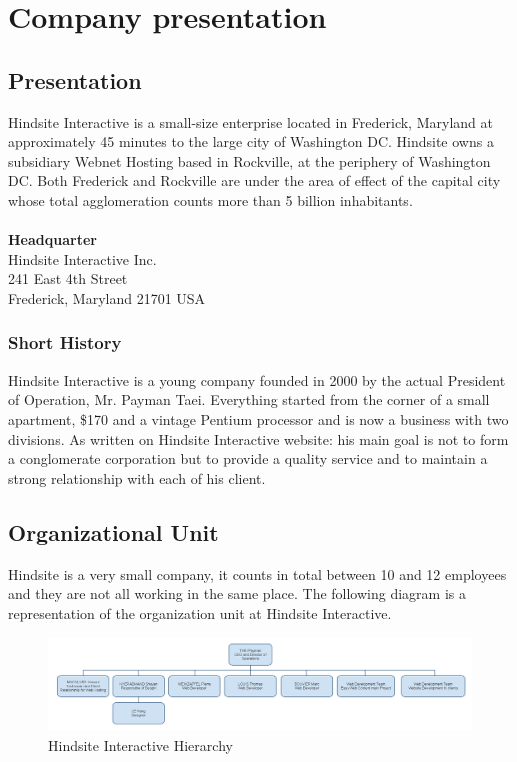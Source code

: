 \chapter{Company presentation}

\section{Presentation}

Hindsite Interactive is a small-size enterprise located in Frederick, Maryland at
approximately 45 minutes to the large city of Washington DC. Hindsite owns a
subsidiary Webnet Hosting based in Rockville, at the periphery of Washington
DC. Both Frederick and Rockville are under the area of effect of the capital
city whose total agglomeration counts more than 5 billion inhabitants.\\
\\
\textbf{Headquarter} \\
Hindsite Interactive Inc.\\
241 East 4th Street\\
Frederick, Maryland 21701 USA\\

\subsection*{Short History}
Hindsite Interactive is a young company founded in 2000 by the actual
President of Operation, Mr. Payman Taei. Everything started from the corner
of a small apartment, \$170 and a vintage Pentium processor and is now a
business with two divisions. As written on Hindsite Interactive website: his main goal is not to form a conglomerate corporation but to provide a quality service and to maintain a
strong relationship with each of his client.

\section{Organizational Unit}

Hindsite is a very small company, it counts in total between 10 and 12
employees and they are not all working in the same place. The following diagram is a representation of the organization unit at Hindsite
Interactive.

\begin{figure}[ht]
\centering
\includegraphics[width=\textwidth]{img/hindsite_organigramme.png}
\caption{Hindsite Interactive Hierarchy}
\label{figure:oragnigramme}
\end{figure}


